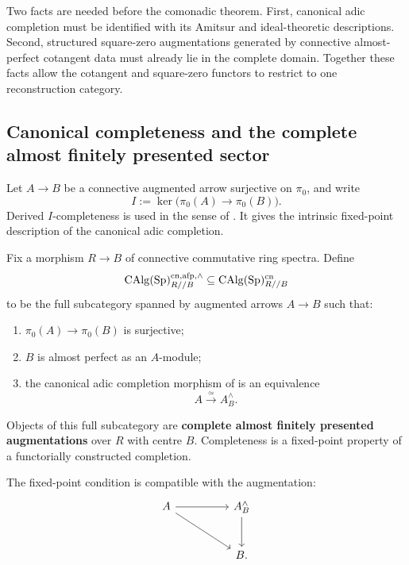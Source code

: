 Two facts are needed before the comonadic theorem. First, canonical adic completion must
be identified with its Amitsur and ideal-theoretic descriptions. Second, structured
square-zero augmentations generated by connective almost-perfect cotangent data must
already lie in the complete domain. Together these facts allow the cotangent and
square-zero functors to restrict to one reconstruction category.

\subsection{Canonical completeness and the complete almost finitely presented sector}

Let \(A\to B\) be a connective augmented arrow surjective on \(\pi_0\), and write
\[
    I:=\ker\bigl(\pi_0(A)\to\pi_0(B)\bigr).
\]
Derived \(I\)-completeness is used in the sense of
\cite[Sections~7.3.3--7.3.4]{LurieSAG}. It gives the intrinsic fixed-point
description of the canonical adic completion.

\begin{definition}
\label{def:complete-almost-finite-augmentation}
Fix a morphism \(R\to B\) of connective commutative ring spectra. Define
\[
    \operatorname{CAlg}(\operatorname{Sp})^{\mathrm{cn},\mathrm{afp},\wedge}_{R//B}
    \subseteq
    \operatorname{CAlg}(\operatorname{Sp})^{\mathrm{cn}}_{R//B}
\]
to be the full subcategory spanned by augmented arrows \(A\to B\) such that:
\begin{enumerate}[label=(\roman*)]
    \item \(\pi_0(A)\to\pi_0(B)\) is surjective;
    \item \(B\) is almost perfect as an \(A\)-module;
    \item the canonical adic completion morphism of
     is an equivalence
    \[
        A\xrightarrow{\simeq}A_B^\wedge.
    \]
\end{enumerate}
Objects of this full subcategory are \textbf{complete almost finitely presented
augmentations} over \(R\) with centre \(B\). Completeness is a fixed-point
property of a functorially constructed completion.

The fixed-point condition is compatible with the augmentation:
\[
\begin{tikzcd}[column sep=huge,row sep=large]
    A \arrow[r] \arrow[dr]
        & A_B^\wedge \arrow[d]
    \\
        & B .
\end{tikzcd}
\]
\end{definition}

